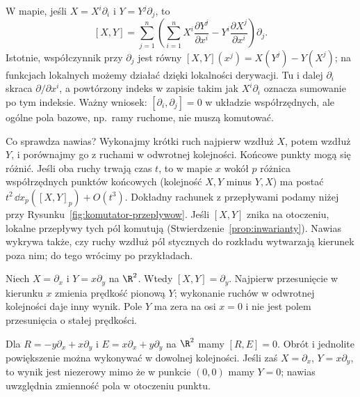 W mapie, jeśli $X=X^i\partial_i$ i $Y=Y^j\partial_j$, to
\begin{equation}\label{eq:nawias-wspolrzedne}
 [X,Y]=\sum_{j=1}^{n}\left(\sum_{i=1}^{n}
 X^i\frac{\partial Y^j}{\partial x^i}-
 Y^i\frac{\partial X^j}{\partial x^i}\right)\partial_j.
\end{equation}
Istotnie, współczynnik przy $\partial_j$ jest równy
$[X,Y](x^j)=X(Y^j)-Y(X^j)$; na funkcjach lokalnych możemy
działać dzięki lokalności derywacji. Tu i dalej $\partial_i$
skraca $\partial/\partial x^i$, a powtórzony indeks w zapisie
takim jak $X^i\partial_i$ oznacza sumowanie po tym indeksie.
Ważny wniosek: $[\partial_i,\partial_j]=0$ w układzie współrzędnych,
ale ogólne pola bazowe, np.\ ramy ruchome, nie muszą komutować.

Co sprawdza nawias? Wykonajmy krótki ruch najpierw wzdłuż $X$,
potem wzdłuż $Y$, i porównajmy go z ruchami w odwrotnej kolejności.
Końcowe punkty mogą się różnić. Jeśli oba ruchy trwają czas $t$,
to w mapie $x$ wokół $p$ różnica współrzędnych punktów końcowych
(kolejność $X,Y$ minus $Y,X$) ma postać
$t^2\,\dd x_p([X,Y]_p)+O(t^3)$. Dokładny rachunek z przepływami podamy
niżej przy Rysunku~\ref{fig:komutator-przeplywow}.
Jeśli $[X,Y]$ znika na otoczeniu, lokalne przepływy tych pól
komutują (Stwierdzenie~\ref{prop:inwarianty}).
Nawias wykrywa także, czy ruchy wzdłuż pól stycznych do rozkładu
wytwarzają kierunek poza nim; do tego wrócimy po przykładach.

\begin{przyklad}\label{prz:scinanie}
Niech $X=\partial_x$ i $Y=x\partial_y$ na $\R^2$.
Wtedy $[X,Y]=\partial_y$. Najpierw przesunięcie w kierunku $x$
zmienia prędkość pionową $Y$; wykonanie ruchów w odwrotnej kolejności
daje inny wynik. Pole $Y$ ma zera na osi $x=0$ i nie jest polem
przesunięcia o stałej prędkości.
\end{przyklad}

\begin{przyklad}
Dla $R=-y\partial_x+x\partial_y$ i $E=x\partial_x+y\partial_y$
na $\R^2$ mamy $[R,E]=0$. Obrót i jednolite powiększenie
można wykonywać w dowolnej kolejności. Jeśli zaś
$X=\partial_x$, $Y=x\partial_y$, to wynik jest niezerowy
mimo że w punkcie $(0,0)$ mamy $Y=0$; nawias uwzględnia zmienność
pola w otoczeniu punktu.
\end{przyklad}



